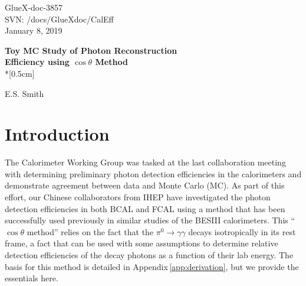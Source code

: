 \documentclass[12pt]{article}
\begin{document}
\begin{flushright}
GlueX-doc-3857\\
SVN: /docs/GlueXdoc/CalEff\\
January 8, 2019
\end{flushright}




\begin{center}
{\Large \bf Toy MC Study of Photon Reconstruction \\ 
Efficiency using $\cos{\theta}$ Method}\\*[0.5cm]
\end{center}

\begin{center}   
{\sc  E.S. Smith}\\  
\end{center}


\section{Introduction}
The Calorimeter Working Group was tasked at the last collaboration meeting with determining preliminary photon detection efficiencies in the calorimeters and demonstrate agreement between data 
and Monte Carlo (MC). 
As part of this effort, our Chinese collaborators from IHEP have investigated the photon detection efficiencies in both BCAL and FCAL \cite{hdnote3844} using a method that has been successfully 
used previously in similar studies of the BESIII calorimeters. This ``$\cos{\theta}$ method'' relies on the fact that the $\pi^0\rightarrow \gamma \gamma$ decays isotropically in its rest frame, a fact that can be used 
with some assumptions to determine relative detection efficiencies of the decay photons as a function of their lab energy. The basis for this method is detailed in Appendix\,\ref{app:derivation}, but we provide
the essentials here.
\end{document}
